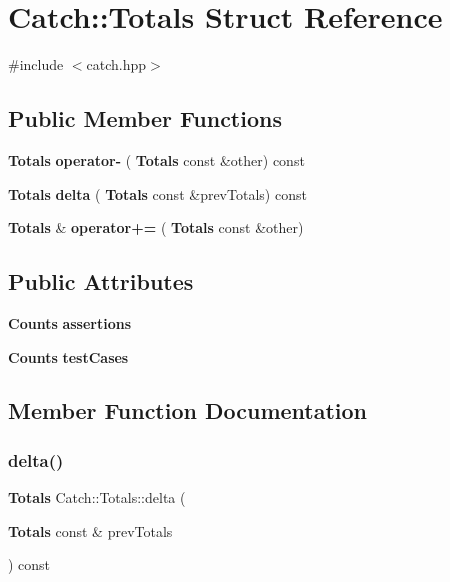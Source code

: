\section{Catch\+:\+:Totals Struct Reference}
\label{struct_catch_1_1_totals}


{\ttfamily \#include $<$catch.\+hpp$>$}

\subsection*{Public Member Functions}
\begin{DoxyCompactItemize}
\item 
\textbf{ Totals} \textbf{ operator-\/} (\textbf{ Totals} const \&other) const
\item 
\textbf{ Totals} \textbf{ delta} (\textbf{ Totals} const \&prev\+Totals) const
\item 
\textbf{ Totals} \& \textbf{ operator+=} (\textbf{ Totals} const \&other)
\end{DoxyCompactItemize}
\subsection*{Public Attributes}
\begin{DoxyCompactItemize}
\item 
\textbf{ Counts} \textbf{ assertions}
\item 
\textbf{ Counts} \textbf{ test\+Cases}
\end{DoxyCompactItemize}


\subsection{Member Function Documentation}
\mbox{\label{struct_catch_1_1_totals_a1a94a654f5f3786b75695e081fc9bca2}} 
\subsubsection{delta()}
{\footnotesize\ttfamily \textbf{ Totals} Catch\+::\+Totals\+::delta (\begin{DoxyParamCaption}\item[{\textbf{ Totals} const \&}]{prev\+Totals }\end{DoxyParamCaption}) const\hspace{0.3cm}{\ttfamily [inline]}}

